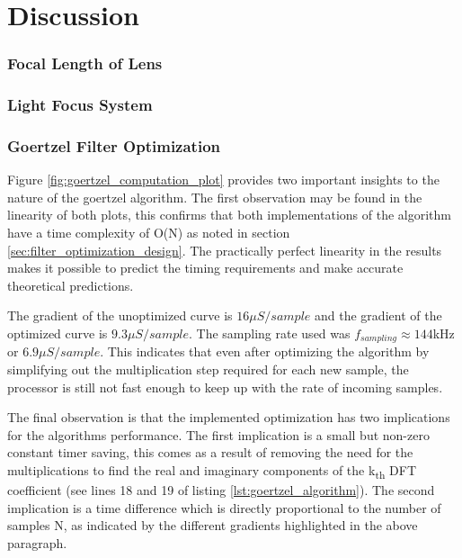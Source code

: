 \chapter{Discussion}
\label{ch_discussion}




\subsection{Focal Length of Lens}


\subsection{Light Focus System}


\subsection{Goertzel Filter Optimization}

Figure \ref{fig:goertzel_computation_plot} provides two important insights to the nature of the goertzel algorithm. The first observation may be found in the linearity of both plots, this confirms that both implementations of the algorithm have a time complexity of O(N) as noted in section \ref{sec:filter_optimization_design}. The practically perfect linearity in the results makes it possible to predict the timing requirements and make accurate theoretical predictions.

The gradient of the unoptimized curve is $16\mu S/sample$ and the gradient of the optimized curve is $9.3\mu S/sample$. The sampling rate used was $f_{sampling} \approx 144$kHz or $6.9\mu S/sample$. This indicates that even after optimizing the algorithm by simplifying out the multiplication step required for each new sample, the processor is still not fast enough to keep up with the rate of incoming samples.

The final observation is that the implemented optimization has two implications for the algorithms performance. The first implication is a small but non-zero constant timer saving, this comes as a result of removing the need for the multiplications to find the real and imaginary components of the k\textsubscript{th} DFT coefficient (see lines 18 and 19 of listing \ref{lst:goertzel_algorithm}). The second implication is a time difference which is directly proportional to the number of samples N, as indicated by the different gradients highlighted in the above paragraph.


